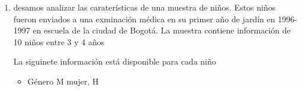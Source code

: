 \documentclass[12pt]{article} %
\begin{document}
\begin{enumerate}
\begin{center}
\begin{figure}
\end{figure}
\end{center}
\item desamos analizar las caraterísticas de una muestra de niños. Estos niños fueron enviados a una exminación médica en su primer año de jardín en 1996-1997 en escuela de la ciudad de Bogotá. La muestra contiene información de 10 niños entre 3 y 4 años\par
La siguinete información está disponible para cada niño
\begin{itemize}
\item Género M mujer, H 
\end{itemize}
\end{enumerate}
\end{document}
